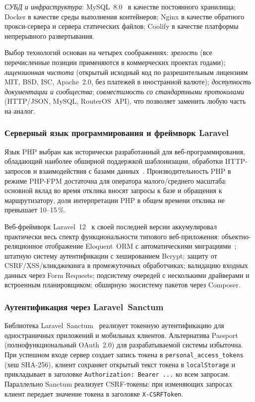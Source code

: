 \emph{СУБД и инфраструктура}: MySQL~8.0~\cite{mysqldoc} в качестве постоянного хранилища; Docker в качестве среды выполнения контейнеров; Nginx в качестве обратного прокси-сервера и сервера статических файлов; Coolify в качестве платформы непрерывного развертывания.

Выбор технологий основан на четырех соображениях: \emph{зрелость} (все перечисленные позиции применяются в коммерческих проектах годами); \emph{лицензионная чистота} (открытый исходный код по разрешительным лицензиям MIT, BSD, ISC, Apache~2.0, без платежей в иностранной валюте); \emph{доступность документации и сообщества}; \emph{совместимость со стандартными протоколами} (HTTP/JSON, MySQL, RouterOS~API), что позволяет заменить любую часть на аналог.

\subsubsection{Серверный язык программирования и фреймворк Laravel}

Язык PHP выбран как исторически разработанный для веб-программирования, обладающий наиболее обширной поддержкой шаблонизации, обработки HTTP-запросов и взаимодействия с базами данных~\cite{phpdoc}. Производительность PHP в режиме PHP-FPM достаточна для оператора малого/среднего масштаба: основной вклад во время отклика вносят запросы к базе и обращения к маршрутизатору, доля интерпретации PHP в общем времени отклика не превышает 10--15\,\%.

Веб-фреймворк Laravel~12~\cite{laraveldoc} к своей последней версии аккумулировал практически весь спектр функциональности типового веб-приложения: объектно-реляционное отображение Eloquent~ORM с автоматическими миграциями~\cite{romanov}; штатную систему аутентификации с хешированием Bcrypt; защиту от CSRF/XSS/кликджекинга в промежуточных обработчиках; валидацию входных данных через Form Requests; подсистему очередей с несколькими драйверами и встроенным планировщиком; обширную экосистему пакетов через Composer.

\subsubsection{Аутентификация через Laravel~Sanctum}

Библиотека Laravel~Sanctum~\cite{sanctum} реализует токенную аутентификацию для одностраничных приложений и мобильных клиентов. Альтернатива Passport (полнофункциональный OAuth~2.0) для разрабатываемой системы избыточна. При успешном входе сервер создает запись токена в \texttt{personal\_access\_tokens} (хеш SHA-256), клиент сохраняет открытый текст токена в \texttt{localStorage} и прикладывает в заголовке \texttt{Authorization: Bearer~...} ко всем запросам. Параллельно Sanctum реализует CSRF-токены: при изменяющих запросах клиент передает значение токена в заголовке \texttt{X-CSRFToken}.

